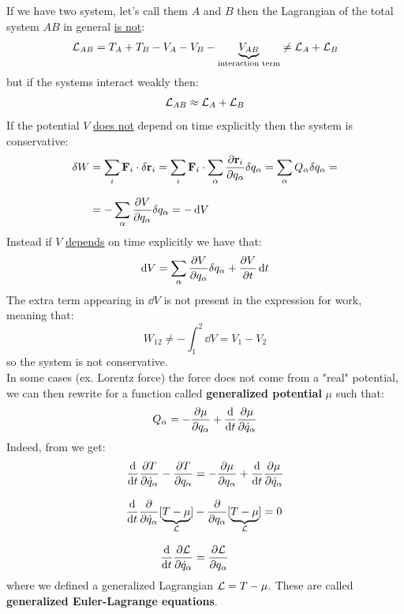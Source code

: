 If we have two system, let's call them $A$ and $B$ then the Lagrangian of the total system $AB$ in general \underline{is not}:
\begin{equation}
    \mathcal{L}_{AB} = T_A + T_B - V_A - V_B - \underbrace{V_{AB}}_{\text{interaction term}}\neq \mathcal{L}_A + \mathcal{L}_B
\end{equation}
but if the systems interact weakly then:
\begin{equation}
    \mathcal{L}_{AB} \approx \mathcal{L}_A + \mathcal{L}_B
\end{equation}
If the potential $V$ \underline{does not} depend on time explicitly then the system is conservative:
\begin{equation}
    \begin{split}
      \delta W &= \bigsum_i \vec{F}_i \cdot \delta \vec{r}_i = \bigsum_i \vec{F}_i \cdot \bigsum_{\alpha}\pdv{ \vec{r}_i}{ q_{\alpha}}\delta q_{\alpha} = \bigsum_{\alpha} Q_{\alpha}\delta q_{\alpha} = \\[8pt]
      &= -\bigsum_{\alpha} \pdv{V}{q_{\alpha}}\delta q_{\alpha} = -\dd{V}
    \end{split}
\end{equation}
Instead if $V$ \underline{depends} on time explicitly we have that:
\begin{equation}
    \dd{V} = \bigsum_{\alpha} \pdv{V}{q_{\alpha}}\delta q_{\alpha} + \pdv{ V}{ t}\dd{t}
\end{equation}
The extra term appearing in $\dd{V}$ is not present in the expression for work, meaning that:
\begin{equation}
    W_{12} \neq -\int_{1}^{2}\dd{V} = V_1 - V_2
\end{equation}
so the system is not conservative.\\
In some cases (ex. Lorentz force) the force does not come from a "real" potential, we can then rewrite \eleref\;for a function called \textbf{generalized potential} $\mu$ such that:
\begin{equation}
    Q_{\alpha} = -\pdv{ \mu}{ q_{\alpha}} +\dv{}{t}\pdv{ \mu}{ \dot{q}_{\alpha}}
\end{equation}
Indeed, from \lagrangeref\;we get:
\begin{equation}
    \begin{split}
      \dv{}{t}\pdv{ T}{ \dot{q}_{\alpha}} - \pdv{ T}{ q_{\alpha}} &= -\pdv{ \mu}{ q_{\alpha}} +\dv{}{t}\pdv{ \mu}{ \dot{q}_{\alpha}} \\[8pt]
      \dv{}{t}\pdv{ }{ \dot{q}_{\alpha}}[\underbrace{T-\mu}_{\lagr}] &- \pdv{}{ q_{\alpha}}[\underbrace{T-\mu}_{\lagr}] = 0 \\[8pt]
      \dv{}{t}\pdv{\lagr}{\dot{q}_{\alpha}} &= \pdv{\lagr}{q_{\alpha}}
    \end{split}
\end{equation}
where we defined a generalized Lagrangian $\mathcal{L} = T-\mu$. These are called \textbf{generalized Euler-Lagrange equations}.
